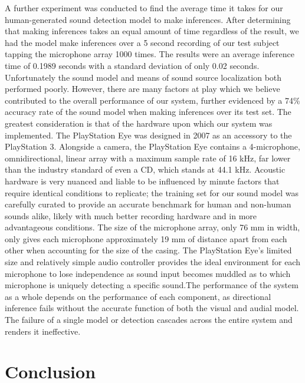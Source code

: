 \documentclass{article}
\begin{document}
A further experiment was conducted to find the average time it takes for our human-generated sound detection model to make inferences. After determining that making inferences takes an equal amount of time regardless of the result, we had the model make inferences over a 5 second recording of our test subject tapping the microphone array 1000 times. The results were an average inference time of 0.1989 seconds with a standard deviation of only 0.02 seconds.
Unfortunately the sound model and means of sound source localization both performed poorly. However, there are many factors at play which we believe contributed to the overall performance of our system, further evidenced by a 74\% accuracy rate of the sound model when making inferences over its test set. The greatest consideration is that of the hardware upon which our system was implemented. The PlayStation Eye was designed in 2007 as an accessory to the PlayStation 3. Alongside a camera, the PlayStation Eye contains a 4-microphone, omnidirectional, linear array with a maximum sample rate of 16 kHz, far lower than the industry standard of even a CD, which stands at 44.1 kHz. Acoustic hardware is very nuanced and liable to be influenced by minute factors that require identical conditions to replicate; the training set for our sound model was carefully curated to provide an accurate benchmark for human and non-human sounds alike, likely with much better recording hardware and in more advantageous conditions. The size of the microphone array, only 76 mm in width, only gives each microphone approximately 19 mm of distance apart from each other when accounting for the size of the casing. The PlayStation Eye’s limited size and relatively simple audio controller provides the ideal environment for each microphone to lose independence as sound input becomes muddled as to which microphone is uniquely detecting a specific sound.The performance of the system as a whole depends on the performance of each component, as directional inference fails without the accurate function of both the visual and audial model. The failure of a single model or detection cascades across the entire system and renders it ineffective.


\section{Conclusion}
\end{document}
